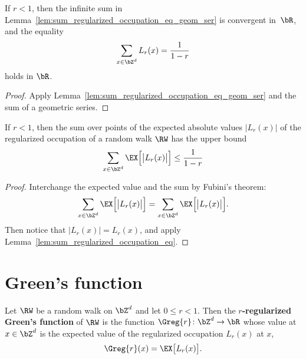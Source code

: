 \begin{lemma}
  \label{lem:sum_regularized_occupation_eq}
  \leanok
  If $r<1$, then the infinite sum in
  Lemma~\ref{lem:sum_regularized_occupation_eq_geom_ser} is convergent
  in~$\bR$, and the equality
  \begin{align*}
    \sum_{x \in \bZ^d} L_r(x) = \frac{1}{1-r}
  \end{align*}
  holds in $\bR$.
\end{lemma}
\begin{proof}
  \leanok
  Apply Lemma~\ref{lem:sum_regularized_occupation_eq_geom_ser}
  and the sum of a geometric series.
\end{proof}

\begin{lemma}
  \label{lem:sum_expected_regularized_occupation_bound}
  \leanok
  If $r<1$, then the
  sum over points of the expected absolute values $|L_r(x)|$ of the regularized
  occupation of a random walk $\RW$ has the upper bound
  \begin{align*}
    \sum_{x \in \bZ^d} \EX \Big[ \big| L_r(x) \big| \Big] \le \frac{1}{1-r}
  \end{align*}
\end{lemma}
\begin{proof}
  \leanok
  Interchange the expected value and the sum by Fubini's theorem:
  \begin{align*}
    \sum_{x \in \bZ^d} \EX \Big[ \big| L_r(x) \big| \Big]
    = \sum_{x \in \bZ^d} \EX \Big[ \big| L_r(x) \big| \Big] .
  \end{align*}
  Then notice that $|L_r(x)| = L_r(x)$, and apply
  Lemma~\ref{lem:sum_regularized_occupation_eq}.
\end{proof}



\section{Green's function}

\begin{definition}
  \label{def:Green_function}
  \leanok
  Let $\RW$ be a random walk on $\bZ^d$ and let $0 \le r < 1$.
  Then the \textbf{$r$-regularized Green's function}
  of $\RW$ is the function $\Greg{r} \colon \bZ^d \to \bR$
  whose value at $x \in \bZ^d$ is the expected value of the
  regularized occupation $L_r(x)$ at $x$,
  \begin{align}\label{eq: reg Green}
    \Greg{r}(x) = \EX \big[ L_r(x) \big] .
  \end{align}
\end{definition}

